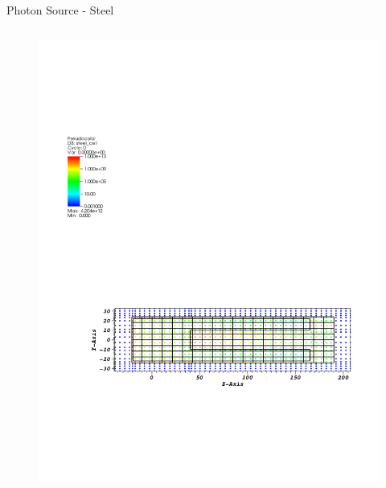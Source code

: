 \documentclass{beamer}
\begin{document}
\begin{frame}{Photon Source - Steel}
\begin{columns}[T]
        \begin{figure}
                \includegraphics[scale=0.49,trim={1cm 16cm 9cm 5cm},clip]{figs/src_steel_cell.pdf}
        \end{figure}
\end{columns}

\begin{columns}[T]


\end{columns}
\end{frame}
\end{document}
